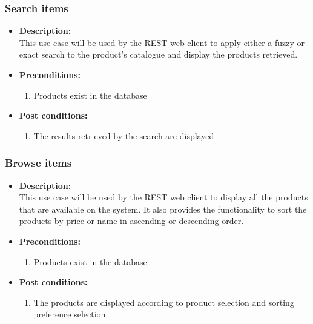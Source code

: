 \documentclass[a4paper,10pt]{article}
\begin{document}
\subsubsection{Search items}
\begin{itemize}
	\item \textbf {Description:}\\
	This use case will be used by the REST web client to apply either a fuzzy or exact search to the product’s catalogue and display the products retrieved.
	\item \textbf {Preconditions:}
		\begin{enumerate}
			\item Products exist in the database
		\end{enumerate}
	\item \textbf {Post conditions:}
		\begin{enumerate}
			\item The results retrieved by the search are displayed
		\end{enumerate}
\end{itemize}
\subsubsection{Browse items}
\begin{itemize}
	\item \textbf {Description:}\\
	This use case will be used by the REST web client to display all the products that are available on the system. It also provides the functionality to sort 			the products by price or name in ascending or descending order.
	\item \textbf {Preconditions:}
		\begin{enumerate}
			\item Products exist in the database
		\end{enumerate}
	\item \textbf {Post conditions:}
		\begin{enumerate}
			\item The products are displayed according to product selection and sorting preference selection
		\end{enumerate}
\end{itemize}
\end{document}
